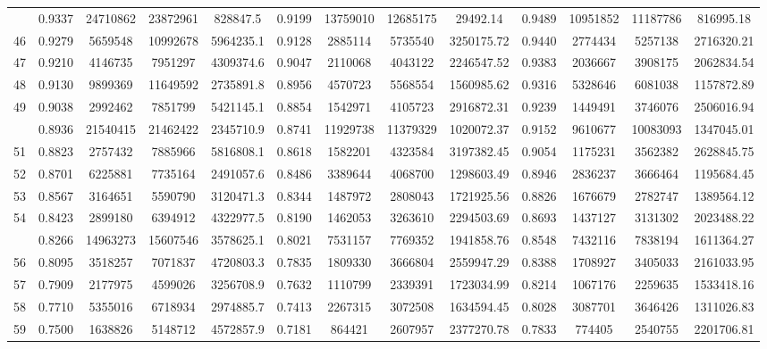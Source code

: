 \documentclass[
  12pt,
]{article}
\begin{document}
\begin{longtable}[t]{lcccccccccccc}
\addlinespace
45 & 0.9337 & 24710862 & 23872961 & 828847.5 & 0.9199 & 13759010 & 12685175 & 29492.14 & 0.9489 & 10951852 & 11187786 & 816995.18\\
46 & 0.9279 & 5659548 & 10992678 & 5964235.1 & 0.9128 & 2885114 & 5735540 & 3250175.72 & 0.9440 & 2774434 & 5257138 & 2716320.21\\
47 & 0.9210 & 4146735 & 7951297 & 4309374.6 & 0.9047 & 2110068 & 4043122 & 2246547.52 & 0.9383 & 2036667 & 3908175 & 2062834.54\\
48 & 0.9130 & 9899369 & 11649592 & 2735891.8 & 0.8956 & 4570723 & 5568554 & 1560985.62 & 0.9316 & 5328646 & 6081038 & 1157872.89\\
49 & 0.9038 & 2992462 & 7851799 & 5421145.1 & 0.8854 & 1542971 & 4105723 & 2916872.31 & 0.9239 & 1449491 & 3746076 & 2506016.94\\
\addlinespace
50 & 0.8936 & 21540415 & 21462422 & 2345710.9 & 0.8741 & 11929738 & 11379329 & 1020072.37 & 0.9152 & 9610677 & 10083093 & 1347045.01\\
51 & 0.8823 & 2757432 & 7885966 & 5816808.1 & 0.8618 & 1582201 & 4323584 & 3197382.45 & 0.9054 & 1175231 & 3562382 & 2628845.75\\
52 & 0.8701 & 6225881 & 7735164 & 2491057.6 & 0.8486 & 3389644 & 4068700 & 1298603.49 & 0.8946 & 2836237 & 3666464 & 1195684.45\\
53 & 0.8567 & 3164651 & 5590790 & 3120471.3 & 0.8344 & 1487972 & 2808043 & 1721925.56 & 0.8826 & 1676679 & 2782747 & 1389564.12\\
54 & 0.8423 & 2899180 & 6394912 & 4322977.5 & 0.8190 & 1462053 & 3263610 & 2294503.69 & 0.8693 & 1437127 & 3131302 & 2023488.22\\
\addlinespace
55 & 0.8266 & 14963273 & 15607546 & 3578625.1 & 0.8021 & 7531157 & 7769352 & 1941858.76 & 0.8548 & 7432116 & 7838194 & 1611364.27\\
56 & 0.8095 & 3518257 & 7071837 & 4720803.3 & 0.7835 & 1809330 & 3666804 & 2559947.29 & 0.8388 & 1708927 & 3405033 & 2161033.95\\
57 & 0.7909 & 2177975 & 4599026 & 3256708.9 & 0.7632 & 1110799 & 2339391 & 1723034.99 & 0.8214 & 1067176 & 2259635 & 1533418.16\\
58 & 0.7710 & 5355016 & 6718934 & 2974885.7 & 0.7413 & 2267315 & 3072508 & 1634594.45 & 0.8028 & 3087701 & 3646426 & 1311026.83\\
59 & 0.7500 & 1638826 & 5148712 & 4572857.9 & 0.7181 & 864421 & 2607957 & 2377270.78 & 0.7833 & 774405 & 2540755 & 2201706.81\\

\end{longtable}
\end{document}
